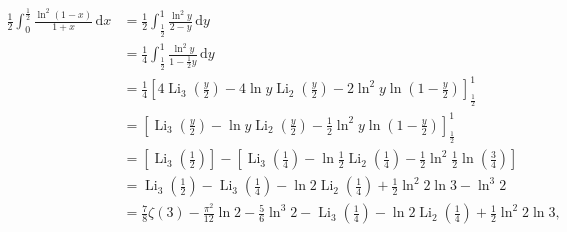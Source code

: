 \begin{align}
\frac12\int_{0}^{\frac12}\frac{\ln^2{(1-x)}}{1+x}\,\mathrm{d}x
&=\frac12\int_{\frac12}^{1}\frac{\ln^2{y}}{2-y}\,\mathrm{d}y\\
&=\frac14\int_{\frac12}^{1}\frac{\ln^2{y}}{1-\frac12y}\,\mathrm{d}y\\
&=\frac14\left[4\operatorname{Li}_3{\left(\frac{y}{2}\right)}-4\ln{y}\operatorname{Li}_2{\left(\frac{y}{2}\right)}-2\ln^2{y}\ln{\left(1-\frac{y}{2}\right)}\right]_{\frac12}^{1}\\
&=\left[\operatorname{Li}_3{\left(\frac{y}{2}\right)}-\ln{y}\operatorname{Li}_2{\left(\frac{y}{2}\right)}-\frac12\ln^2{y}\ln{\left(1-\frac{y}{2}\right)}\right]_{\frac12}^{1}\\
&=\left[\operatorname{Li}_3{\left(\frac12\right)}\right]-\left[\operatorname{Li}_3{\left(\frac14\right)}-\ln{\frac12}\operatorname{Li}_2{\left(\frac14\right)}-\frac12\ln^2{\frac12}\ln{\left(\frac34\right)}\right]\\
&=\operatorname{Li}_3{\left(\frac12\right)}-\operatorname{Li}_3{\left(\frac14\right)}-\ln{2}\operatorname{Li}_2{\left(\frac14\right)}+\frac12\ln^2{2}\ln{3}-\ln^3{2}\\
&=\frac78\zeta{(3)}-\frac{\pi^2}{12}\ln{2}-\frac56\ln^3{2}-\operatorname{Li}_3{\left(\frac14\right)}-\ln{2}\operatorname{Li}_2{\left(\frac14\right)}+\frac12\ln^2{2}\ln{3},
\end{align}
